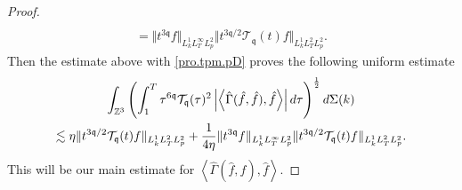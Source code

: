 \documentclass[reqno]{amsart}
\newcommand{\pv}{p}
\newcommand{\irnp}[2]{\left\langle {#1},{#2} \right\rangle}
\newcommand{\qq}{\mathfrak{q}}
\newcommand{\tTq}{t^{3\qq}}
\newcommand{\Z}{\mathbb{Z}}
\newcommand{\tw}{\mathcal{T}_{\qq}}
\theoremstyle{definition}
\numberwithin{equation}{section}
\numberwithin{theorem}{section}
\begin{document}
\begin{proof}
\begin{multline*}
\\
=\Vert \tTq{f}\Vert_{L^1_kL^\infty_TL^2_{\pv}}
\Vert t^{3\qq/2}\tw(t) {f}\Vert_{L^1_kL^2_TL^2_{\pv}}.
\end{multline*}
Then the estimate above with \eqref{pro.tpm.pD} proves the following uniform estimate
\begin{multline}\notag 
    \int_{\Z^3} 
\left(\int^T_1 \tau^{6\qq} \tw(\tau)^2 \left|{\irnp{\hat{\Gamma}(\hat{f},\hat{f})}{\hat{f}}}\right|
d\tau \right)^{\frac12}
d\Sigma(k)
\\
\lesssim
\eta\Vert t^{3\qq/2}\tw(t) {f}\Vert_{L^1_kL^2_TL^2_{\pv}}
+
\frac{1}{4\eta}
\Vert \tTq{f}\Vert_{L^1_kL^\infty_TL^2_{\pv}}
\Vert t^{3\qq/2}\tw(t) {f}\Vert_{L^1_kL^2_TL^2_{\pv}}.
\end{multline}
This will be our main estimate for ${\irnp{\hat{\Gamma}(\hat{f},\hat{f})}{\hat{f}}}$.


\end{proof}
\end{document}
